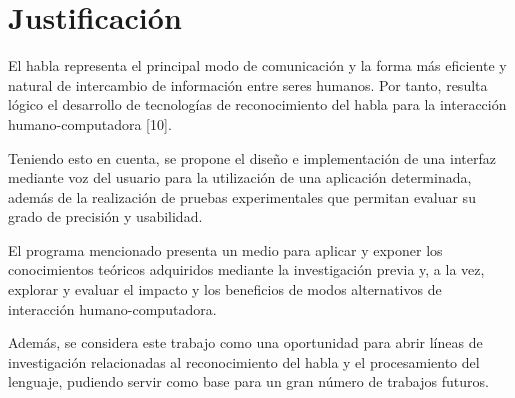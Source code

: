 \section{Justificaci\'{o}n}
\label{sec:just}

El habla representa el principal modo de comunicaci\'{o}n y la forma m\'{a}s eficiente y 
natural de intercambio de informaci\'{o}n entre seres humanos. Por tanto, resulta l\'{o}gico 
el desarrollo de tecnolog\'{i}as de reconocimiento del habla para la interacci\'{o}n 
humano-computadora [10]. 

Teniendo esto en cuenta, se propone el dise\~{n}o e implementaci\'{o}n de una interfaz 
mediante voz del usuario para la utilizaci\'{o}n de una aplicaci\'{o}n determinada, 
adem\'{a}s de la realizaci\'{o}n de pruebas experimentales que permitan evaluar su grado 
de precisi\'{o}n y usabilidad.

El programa mencionado presenta un medio para aplicar y exponer los conocimientos te\'{o}ricos 
adquiridos mediante la investigaci\'{o}n previa y, a la vez, explorar y evaluar el impacto y 
los beneficios de modos alternativos de interacci\'{o}n humano-computadora.

Adem\'{a}s, se considera este trabajo como una oportunidad para abrir l\'{i}neas de investigaci\'{o}n 
relacionadas al reconocimiento del habla y el procesamiento del lenguaje, pudiendo servir como base 
para un gran n\'{u}mero de trabajos futuros.
